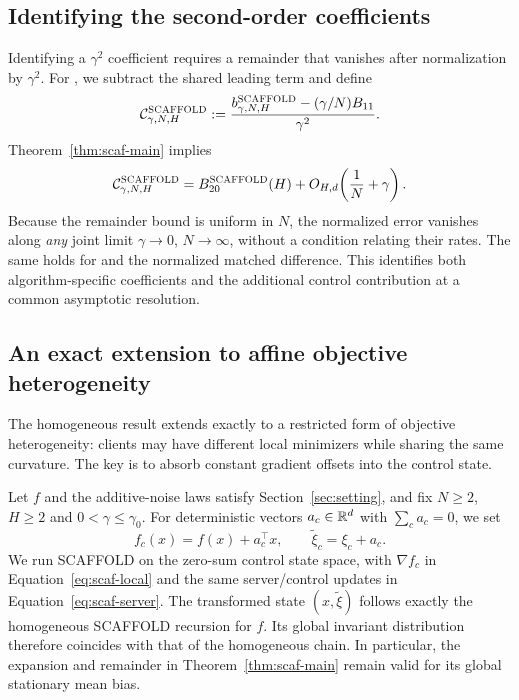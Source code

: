 \subsection{Identifying the second-order coefficients}

Identifying a $\gamma^2$ coefficient requires a remainder that vanishes after normalization by $\gamma^2$. For \Scaf{}, we subtract the shared leading term and define
\begin{equation}
\label{eq:scaf-normalized}
\mathcal C^{\textnormal{\textsc{SCAFFOLD}}}_{\gamma,N,H}
:=\frac{b^{\textnormal{\textsc{SCAFFOLD}}}_{\gamma,N,H}-(\gamma/N)B_{11}}{\gamma^2}.
\end{equation}
Theorem~\ref{thm:scaf-main} implies
\begin{equation}
\label{eq:scaf-normalized-limit}
\mathcal C^{\textnormal{\textsc{SCAFFOLD}}}_{\gamma,N,H}
=B_{20}^{\textnormal{\textsc{SCAFFOLD}}}(H)+O_{H,d}\!\left(\frac1N+\gamma\right).
\end{equation}
Because the remainder bound is uniform in $N$, the normalized error vanishes along \emph{any} joint limit $\gamma\to0$, $N\to\infty$, without a condition relating their rates. The same holds for \FedAvg{} and the normalized matched difference. This identifies both algorithm-specific coefficients and the additional control contribution at a common asymptotic resolution.


\subsection{An exact extension to affine objective heterogeneity}
\label{sec:affine-extension}

The homogeneous result extends exactly to a restricted form of objective heterogeneity: clients may have different local minimizers while sharing the same curvature. The key is to absorb constant gradient offsets into the \Scaf{} control state.

\begin{samepage}
\begin{proposition}
\label{prop:affine-shift}
Let $f$ and the additive-noise laws satisfy Section~\ref{sec:setting}, and fix $N\ge2$, $H\ge2$ and $0<\gamma\le\gamma_0$. For deterministic vectors $a_c\in\mathbb{R}^d$ with $\sum_ca_c=0$, we set
\begin{equation}
\label{eq:affine-objectives}
f_c(x)=f(x)+a_c^\top x,\qquad \widetilde\xi_c=\xi_c+a_c.
\end{equation}
We run SCAFFOLD on the zero-sum control state space, with $\nabla f_c$ in Equation~\eqref{eq:scaf-local} and the same server/control updates in Equation~\eqref{eq:scaf-server}. The transformed state $(x,\widetilde\xi)$ follows exactly the homogeneous SCAFFOLD recursion for $f$. Its global invariant distribution therefore coincides with that of the homogeneous chain. In particular, the expansion and remainder in Theorem~\ref{thm:scaf-main} remain valid for its global stationary mean bias.
\end{proposition}
\end{samepage}


